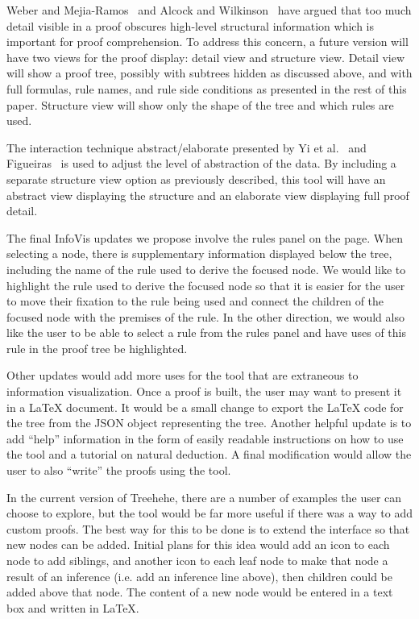 \documentclass[journal]{vgtc}                %
\newcommand{\projectname}{Treehehe}
\begin{document}
Weber and Mejia-Ramos~\cite{majorsbeliefs-weber+mejiaramos} and Alcock and Wilkinson~\cite{eproofs-alcock+wilkinson} have argued that too much detail visible in a proof obscures high-level structural information which is important for proof comprehension. To address this concern, a future version will have two views for the proof display: detail view and structure view. Detail view will show a proof tree, possibly with subtrees hidden as discussed above, and with full formulas, rule names, and rule side conditions as presented in the rest of this paper. Structure view will show only the shape of the tree and which rules are used. %

The interaction technique abstract/elaborate presented by Yi et al.~\cite{interaction-yietal} and Figueiras~\cite{interaction-figueiras} is used to adjust the level of abstraction of the data. By including a separate structure view option as previously described, this tool will have an abstract view displaying the structure and an elaborate view displaying full proof detail.

The final InfoVis updates we propose involve the rules panel on the page. When selecting a node, there is supplementary information displayed below the tree, including the name of the rule used to derive the focused node. We would like to highlight the rule used to derive the focused node so that it is easier for the user to move their fixation to the rule being used and connect the children of the focused node with the premises of the rule. In the other direction, we would also like the user to be able to select a rule from the rules panel and have uses of this rule in the proof tree be highlighted.%

Other updates would add more uses for the tool that are extraneous to information visualization. Once a proof is built, the user may want to present it in a \LaTeX{} document. It would be a small change to export the \LaTeX{} code for the tree from the JSON object representing the tree. Another helpful update is to add ``help'' information in the form of easily readable instructions on how to use the tool and a tutorial on natural deduction. A final modification would allow the user to also ``write'' the proofs using the tool.

In the current version of \projectname{}, there are a number of examples the user can choose to explore, but the tool would be far more useful if there was a way to add custom proofs. The best way for this to be done is to extend the interface so that new nodes can be added. Initial plans for this idea would add an icon to each node to add siblings, and another icon to each leaf node to make that node a result of an inference (i.e. add an inference line above), then children could be added above that node. The content of a new node would be entered in a text box and written in \LaTeX{}.%
\end{document}
